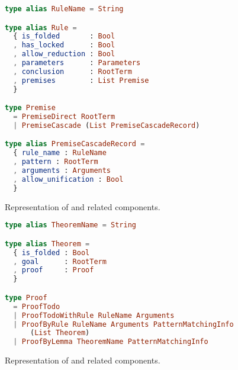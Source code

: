 \documentclass[master.tex]{subfiles}
\begin{document}
\begin{figure}[H]
\begin{framed}
\begin{lstlisting}[language=elm]
type alias RuleName = String

type alias Rule =
  { is_folded       : Bool
  , has_locked      : Bool
  , allow_reduction : Bool
  , parameters      : Parameters
  , conclusion      : RootTerm
  , premises        : List Premise
  }

type Premise
  = PremiseDirect RootTerm
  | PremiseCascade (List PremiseCascadeRecord)

type alias PremiseCascadeRecord =
  { rule_name : RuleName
  , pattern : RootTerm
  , arguments : Arguments
  , allow_unification : Bool
  }
\end{lstlisting}

\end{framed}
\caption{Representation of  and related components.}
\label{fig:implementation-repo-rule}
\end{figure}


\begin{figure}[H]
\begin{framed}
\begin{lstlisting}[language=elm]
type alias TheoremName = String

type alias Theorem =
  { is_folded : Bool
  , goal      : RootTerm
  , proof     : Proof
  }

type Proof
  = ProofTodo
  | ProofTodoWithRule RuleName Arguments
  | ProofByRule RuleName Arguments PatternMatchingInfo
      (List Theorem)
  | ProofByLemma TheoremName PatternMatchingInfo
\end{lstlisting}
\end{framed}
\caption{Representation of  and related components.}
\label{fig:implementation-repo-theorem}
\end{figure}
\end{document}
